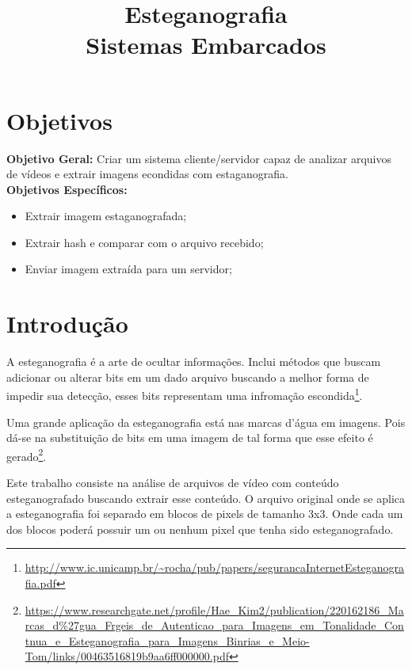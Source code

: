 \documentclass[journal,transmag]{IEEEtran}
\begin{document}
\title{Esteganografia\\ Sistemas Embarcados}

\author{}


\maketitle

\section{Objetivos}

\textbf{Objetivo Geral:} Criar um sistema cliente/servidor capaz de analizar arquivos de vídeos e extrair imagens econdidas com estaganografia.
\\

\textbf{Objetivos Específicos:}
\begin{itemize}
	\item Extrair imagem estaganografada;
	\item Extrair hash e comparar com o arquivo recebido;
	\item Enviar imagem extraída para um servidor;
\end{itemize}

\section{Introdução}

A esteganografia é a arte de ocultar informações. Inclui métodos que buscam adicionar ou alterar bits em um dado arquivo buscando a melhor forma de impedir sua detecção, esses bits representam uma infromação escondida\footnote{\url{http://www.ic.unicamp.br/\~rocha/pub/papers/segurancaInternetEsteganografia.pdf}}.

Uma grande aplicação da esteganografia está nas marcas d'água em imagens. Pois dá-se na substituição de bits em uma imagem de tal forma que esse efeito é gerado\footnote{\url{https://www.researchgate.net/profile/Hae_Kim2/publication/220162186_Marcas_d\%27gua_Frgeis_de_Autenticao_para_Imagens_em_Tonalidade_Contnua_e_Esteganografia_para_Imagens_Binrias_e_Meio-Tom/links/00463516819b9aa6ff000000.pdf}}.

Este trabalho consiste na análise de arquivos de vídeo com conteúdo esteganografado buscando extrair esse conteúdo. O arquivo original onde se aplica a esteganografia foi separado em blocos de pixels de tamanho 3x3. Onde cada um dos blocos poderá possuir um ou nenhum pixel que tenha sido esteganografado.
\end{document}
